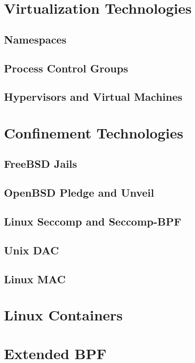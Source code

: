 \section{Virtualization Technologies}%
\label{s:virtualization-bg}

\subsection{Namespaces}%
\label{ss:namespaces-bg}

\subsection{Process Control Groups}%
\label{ss:cgroups-bg}

\subsection{Hypervisors and Virtual Machines}%
\label{ss:vms-bg}




\section{Confinement Technologies}%
\label{s:confinement-bg}

\subsection{FreeBSD Jails}%
\label{ss:jails-bg}

\subsection{OpenBSD Pledge and Unveil}%
\label{ss:pledge-bg}

\subsection{Linux Seccomp and Seccomp-BPF}%
\label{ss:seccomp-bg}

\subsection{Unix DAC}%
\label{ss:unix-dac-bg}

\subsection{Linux MAC}%
\label{ss:linux-mac-bg}




\section{Linux Containers}%
\label{s:containers-bg}




\section{Extended BPF}%
\label{s:ebpf-bg}



